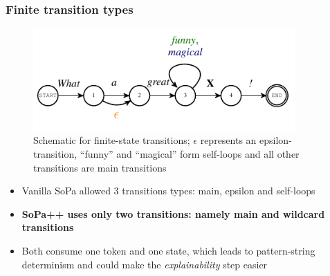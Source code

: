 \documentclass[10pt]{beamer}
\let\oldcitep=\citep
\renewcommand\citep[1]{{\textcolor{blue}{\oldcitep{#1}}}}
\begin{document}
\subsection{}
\begin{frame}
  \frametitle{Finite transition types}
  \begin{figure}				       
    \captionsetup{justification=centering}
    \includegraphics[width=10cm]{pdfs/borrowed/linear_fsa_special_transitions.pdf}
    \caption{Schematic for finite-state transitions; $\epsilon$ represents an epsilon-transition, ``funny'' and ``magical'' form self-loops and all other transitions are main transitions \citep{schwartz2018sopa}}
  \end{figure}
  \begin{itemize} 
    \item Vanilla SoPa allowed 3 transitions types: main, epsilon and self-loops
    \item \textbf{SoPa++ uses only two transitions: namely main and wildcard transitions}
    \item Both consume one token and one state, which leads to pattern-string determinism and could make the \textit{explainability} step easier
  \end{itemize} 
\end{frame} 
\end{document}
